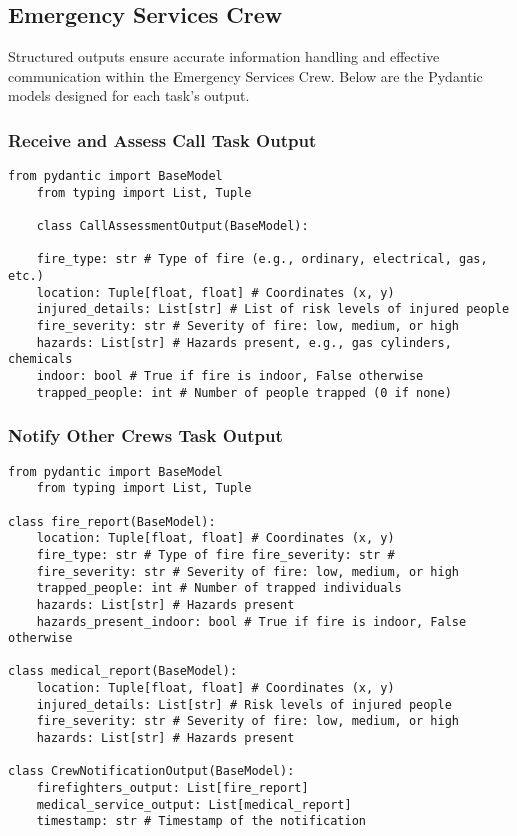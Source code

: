 \subsection{Emergency Services Crew}

Structured outputs ensure accurate information handling and effective communication within the Emergency Services Crew. Below 
are the Pydantic models designed for each task's output.

\subsubsection{Receive and Assess Call Task Output}

\begin{lstlisting}[caption={Pydantic model for Receive and Assess Call Task Output}] 
    from pydantic import BaseModel
    from typing import List, Tuple

    class CallAssessmentOutput(BaseModel): 

    fire_type: str # Type of fire (e.g., ordinary, electrical, gas, etc.) 
    location: Tuple[float, float] # Coordinates (x, y) 
    injured_details: List[str] # List of risk levels of injured people 
    fire_severity: str # Severity of fire: low, medium, or high 
    hazards: List[str] # Hazards present, e.g., gas cylinders, chemicals 
    indoor: bool # True if fire is indoor, False otherwise 
    trapped_people: int # Number of people trapped (0 if none) \end{lstlisting}

\subsubsection{Notify Other Crews Task Output}

\begin{lstlisting}[caption={Pydantic model for Notify Other Crews Task Output}] 
    from pydantic import BaseModel 
    from typing import List, Tuple

class fire_report(BaseModel): 
    location: Tuple[float, float] # Coordinates (x, y) 
    fire_type: str # Type of fire fire_severity: str # 
    fire_severity: str # Severity of fire: low, medium, or high
    trapped_people: int # Number of trapped individuals 
    hazards: List[str] # Hazards present
    hazards_present_indoor: bool # True if fire is indoor, False otherwise

class medical_report(BaseModel): 
    location: Tuple[float, float] # Coordinates (x, y) 
    injured_details: List[str] # Risk levels of injured people 
    fire_severity: str # Severity of fire: low, medium, or high 
    hazards: List[str] # Hazards present

class CrewNotificationOutput(BaseModel): 
    firefighters_output: List[fire_report]
    medical_service_output: List[medical_report]
    timestamp: str # Timestamp of the notification \end{lstlisting}

